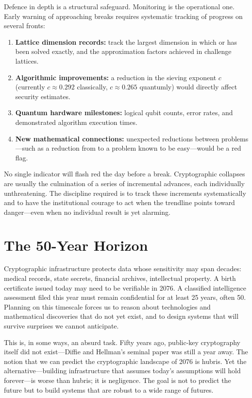 Defence in depth is a structural safeguard.  Monitoring is the operational one.  Early warning of approaching breaks requires systematic tracking of progress on several fronts:
\begin{enumerate}
\item \textbf{Lattice dimension records:} track the largest dimension in which \svp{} or \cvp{} has been solved exactly, and the approximation factors achieved in challenge lattices.
\item \textbf{Algorithmic improvements:} a reduction in the sieving exponent $c$ (currently $c \approx 0.292$ classically, $c \approx 0.265$ quantumly) would directly affect security estimates.
\item \textbf{Quantum hardware milestones:} logical qubit counts, error rates, and demonstrated algorithm execution times.
\item \textbf{New mathematical connections:} unexpected reductions between problems---such as a reduction from \mlwe{} to a problem known to be easy---would be a red flag.
\end{enumerate}

No single indicator will flash red the day before a break.  Cryptographic collapses are usually the culmination of a series of incremental advances, each individually unthreatening.  The discipline required is to track these increments systematically and to have the institutional courage to act when the trendline points toward danger---even when no individual result is yet alarming.


\section{The 50-Year Horizon}
\label{sec:horizon}

Cryptographic infrastructure protects data whose sensitivity may span decades: medical records, state secrets, financial archives, intellectual property.  A birth certificate issued today may need to be verifiable in 2076.  A classified intelligence assessment filed this year must remain confidential for at least 25 years, often 50.  Planning on this timescale forces us to reason about technologies and mathematical discoveries that do not yet exist, and to design systems that will survive surprises we cannot anticipate.

This is, in some ways, an absurd task.  Fifty years ago, public-key cryptography itself did not exist---Diffie and Hellman's seminal paper was still a year away.  The notion that we can predict the cryptographic landscape of 2076 is hubris.  Yet the alternative---building infrastructure that assumes today's assumptions will hold forever---is worse than hubris; it is negligence.  The goal is not to predict the future but to build systems that are robust to a wide range of futures.

